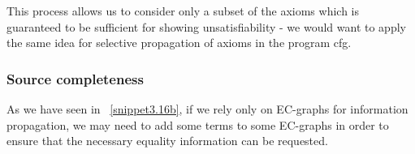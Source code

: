 This process allows us to consider only a subset of the axioms which is guaranteed to be sufficient for showing unsatisfiability -  we would want to apply the same idea for selective propagation of axioms in the program cfg.









































%

\subsubsection{Source completeness}
As we have seen in ~\ref{snippet3.16b}, if we rely only on EC-graphs for information propagation, we may need to add some terms to some EC-graphs in order to ensure that the necessary equality information can be requested.

